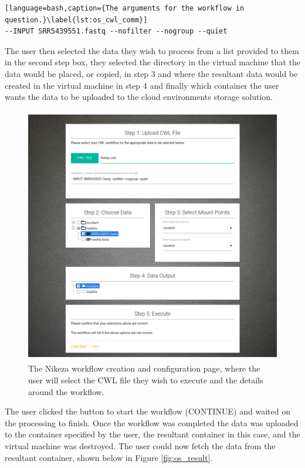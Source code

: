 \begin{lstlisting}[language=bash,caption={The arguments for the workflow in question.}\label{lst:os_cwl_comm}]
--INPUT SRR5439551.fastq --nofilter --nogroup --quiet
\end{lstlisting}

The user then selected the data they wish to process from a list provided to them in the second step box, they selected the directory in the virtual machine that the data would be placed, or copied, in step 3 and where the resultant data would be created in the virtual machine in step 4 and finally which container the user wants the data to be uploaded to the cloud environments storage solution.

\begin{figure}[h!]
\centering
\includegraphics[width=\textwidth]{Figures/4_os_config.png}
\decoRule
\caption[Nikeza Workflow Configuration Screen]{The Nikeza workflow creation and configuration page, where the user will select the CWL file they wish to execute and the details around the workflow.}
\label{fig:os_conf}
\end{figure}

The user clicked the button to start the workflow (CONTINUE) and waited on the processing to finish. Once the workflow was completed the data was uploaded to the container specified by the user, the resultant container in this case, and the virtual machine was destroyed. The user could now fetch the data from the resultant container, shown below in Figure \ref{fig:os_result}.


